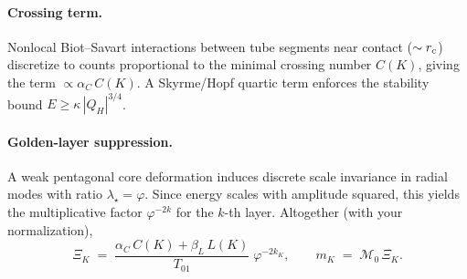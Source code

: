 \paragraph*{Crossing term.}
Nonlocal Biot--Savart interactions between tube segments near contact (\(\sim r_c\)) discretize to counts proportional to the minimal crossing number \(C(K)\), giving
the term \(\propto \alpha_C\,C(K)\). A Skyrme/Hopf quartic term enforces the stability bound \(E\ge \kappa\,|Q_H|^{3/4}\).

\paragraph*{Golden-layer suppression.}
A weak pentagonal core deformation induces discrete scale invariance in radial modes with ratio \(\lambda_\star=\varphi\).
Since energy scales with amplitude squared, this yields the multiplicative factor \(\varphi^{-2k}\) for the \(k\)-th layer.
Altogether (with your normalization),
\begin{equation}
	\Xi_K \;=\; \frac{\alpha_C\,C(K)+\beta_{\!L}\,L(K)}{T_{01}}\;\varphi^{-2k_K},
	\qquad
	m_K \;=\; \mathcal{M}_0\,\Xi_K .
\end{equation}
